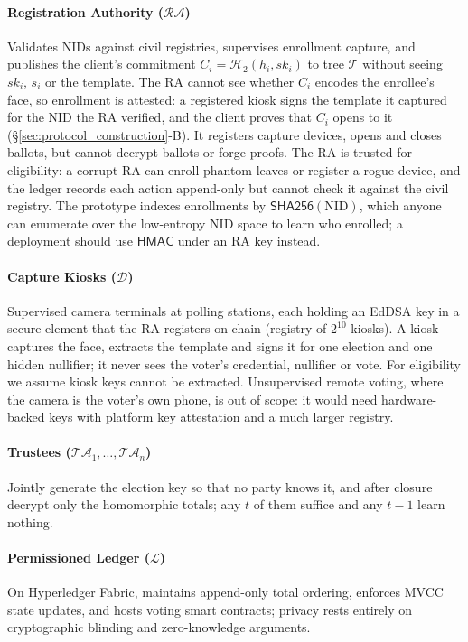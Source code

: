 \documentclass[10pt,letterpaper,journal]{IEEEtran}
\begin{document}
\paragraph{Registration Authority ($\mathcal{RA}$)} Validates NIDs against civil registries, supervises enrollment capture, and publishes the client's commitment $C_i = \mathcal{H}_2(h_i, sk_i)$ to tree $\mathcal{T}$ without seeing $sk_i$, $s_i$ or the template. The RA cannot see whether $C_i$ encodes the enrollee's face, so enrollment is attested: a registered kiosk signs the template it captured for the NID the RA verified, and the client proves that $C_i$ opens to it (\S\ref{sec:protocol_construction}-B). It registers capture devices, opens and closes ballots, but cannot decrypt ballots or forge proofs. The RA is trusted for eligibility: a corrupt RA can enroll phantom leaves or register a rogue device, and the ledger records each action append-only but cannot check it against the civil registry. The prototype indexes enrollments by $\mathsf{SHA256}(\text{NID})$, which anyone can enumerate over the low-entropy NID space to learn who enrolled; a deployment should use $\mathsf{HMAC}$ under an RA key instead.

\paragraph{Capture Kiosks ($\mathcal{D}$)} Supervised camera terminals at polling stations, each holding an EdDSA key in a secure element that the RA registers on-chain (registry of $2^{10}$ kiosks). A kiosk captures the face, extracts the template and signs it for one election and one hidden nullifier; it never sees the voter's credential, nullifier or vote. For eligibility we assume kiosk keys cannot be extracted. Unsupervised remote voting, where the camera is the voter's own phone, is out of scope: it would need hardware-backed keys with platform key attestation and a much larger registry.

\paragraph{Trustees ($\mathcal{TA}_1, \ldots, \mathcal{TA}_n$)} Jointly generate the election key so that no party knows it, and after closure decrypt only the homomorphic totals; any $t$ of them suffice and any $t-1$ learn nothing.

\paragraph{Permissioned Ledger ($\mathcal{L}$)} On Hyperledger Fabric, maintains append-only total ordering, enforces MVCC state updates, and hosts voting smart contracts; privacy rests entirely on cryptographic blinding and zero-knowledge arguments.
\end{document}

